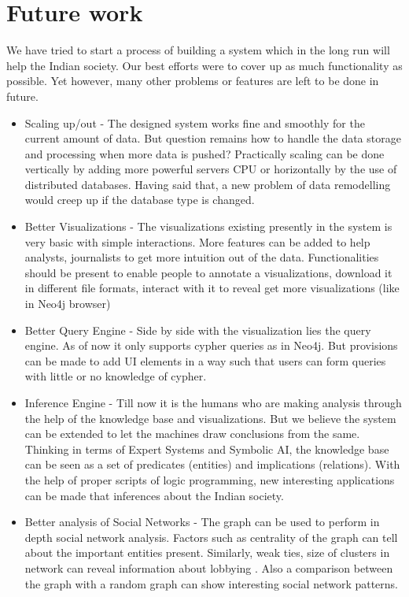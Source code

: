 \section{Future work}
We have tried to start a process of building a system which in the long run will help the Indian society. Our best efforts were to cover up as much functionality as possible. Yet however, many other problems or features are left to be done in future.
\begin{itemize}
\item Scaling up/out - The designed system works fine and smoothly for the current amount of data. But question remains how to handle the data storage and processing when more data is pushed? Practically scaling can be done vertically by adding more powerful servers CPU or horizontally by the use of distributed databases. Having said that, a new problem of data remodelling would creep up if the database type is changed.

\item Better Visualizations - The visualizations existing presently in the system is very basic with simple interactions. More features can be added to help analysts, journalists to get more intuition out of the data. Functionalities should be present to enable people to annotate a visualizations, download it in different file formats, interact with it to reveal get more visualizations (like in Neo4j browser)

\item Better Query Engine - Side by side with the visualization lies the query engine. As of now it only supports cypher queries as in Neo4j. But provisions can be made to add UI elements in a way such that users can form queries with little or no knowledge of cypher.

\item Inference Engine - Till now it is the humans who are making analysis through the help of the knowledge base and visualizations. But we believe the system can be extended to let the machines draw conclusions from the same. Thinking in terms of Expert Systems and Symbolic AI, the knowledge base can be seen as a set of predicates (entities) and implications (relations). With the help of proper scripts of logic programming, new interesting applications can be made that inferences about the Indian society.

\item Better analysis of Social Networks - The graph can be used to perform in depth social network analysis. Factors such as centrality of the graph can tell about the important entities present. Similarly, weak ties, size of clusters in network can reveal information about lobbying . Also a comparison between the graph with a random graph can show interesting social network patterns.


\end{itemize}
